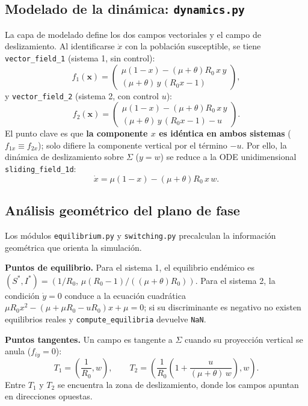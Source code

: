 \documentclass[12pt,letterpaper]{article}
\begin{document}
\subsection{Modelado de la dinámica: \texttt{dynamics.py}}
La capa de modelado define los dos campos vectoriales y el campo de deslizamiento. Al identificarse $\dot{x}$ con la población susceptible, se tiene \texttt{vector\_field\_1} (sistema 1, sin control):
\begin{equation}
f_1(\mathbf{x}) = \begin{pmatrix} \mu(1-x) - (\mu+\theta)R_0\,x\,y \\ (\mu+\theta)\,y\,(R_0 x - 1) \end{pmatrix},
\end{equation}
y \texttt{vector\_field\_2} (sistema 2, con control $u$):
\begin{equation}
f_2(\mathbf{x}) = \begin{pmatrix} \mu(1-x) - (\mu+\theta)R_0\,x\,y \\ (\mu+\theta)\,y\,(R_0 x - 1) - u \end{pmatrix}.
\end{equation}
El punto clave es que \textbf{la componente $x$ es idéntica en ambos sistemas} ($f_{1x} \equiv f_{2x}$); solo difiere la componente vertical por el término $-u$. Por ello, la dinámica de deslizamiento sobre $\Sigma$ ($y = w$) se reduce a la ODE unidimensional \texttt{sliding\_field\_1d}:
\begin{equation}
\dot{x} = \mu(1-x) - (\mu+\theta)R_0\,x\,w .
\end{equation}

\subsection{Análisis geométrico del plano de fase}
Los módulos \texttt{equilibrium.py} y \texttt{switching.py} precalculan la información geométrica que orienta la simulación.

\textbf{Puntos de equilibrio.} Para el sistema 1, el equilibrio endémico es $(S^*, I^*) = (1/R_0,\, \mu(R_0-1)/((\mu+\theta)R_0))$. Para el sistema 2, la condición $\dot{y}=0$ conduce a la ecuación cuadrática $\mu R_0 x^2 - (\mu + \mu R_0 - u R_0)x + \mu = 0$; si su discriminante es negativo no existen equilibrios reales y \texttt{compute\_equilibria} devuelve \texttt{NaN}.

\textbf{Puntos tangentes.} Un campo es tangente a $\Sigma$ cuando su proyección vertical se anula ($f_{iy}=0$):
\begin{equation}
T_1 = \left(\frac{1}{R_0}, w\right), \qquad
T_2 = \left(\frac{1}{R_0}\left(1 + \frac{u}{(\mu+\theta)\,w}\right), w\right) .
\end{equation}
Entre $T_1$ y $T_2$ se encuentra la zona de deslizamiento, donde los campos apuntan en direcciones opuestas.
\end{document}
